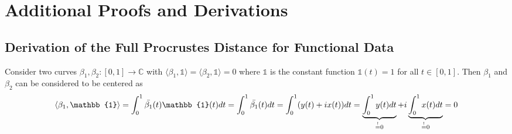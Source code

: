\section{Additional Proofs and Derivations}

\subsection{Derivation of the Full Procrustes Distance for Functional Data}
\label{app:deriv-full-proc-dist}
Consider two curves $\beta_1, \beta_2 : [0,1] \rightarrow \mathbb{C}$ with $\langle \beta_1, \mathbb{1} \rangle = \langle \beta_2, \mathbb{1} \rangle = 0$ where $\mathbb{1}$ is the constant function $\mathbb{1}(t) = 1$ for all $t \in [0,1]$.
Then $\beta_1$ and $\beta_2$ can be considered to be centered as
$$ \langle \beta_1, \mathbb{1} \rangle
= \int_0^1 \bar{\beta_1}(t)\mathbb{1}(t)dt\\
= \int_0^1 \bar{\beta_1}(t)dt
= \int_0^1 (y(t) + i x(t))dt
= \underbrace{\int_0^1 y(t)dt}_{\stackrel{!}{=}0} + i \underbrace{\int_0^1 x(t)dt}_{\stackrel{!}{=}0} = 0 $$

